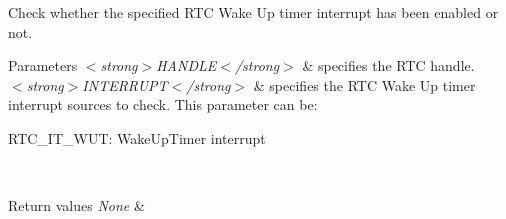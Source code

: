 Check whether the specified R\+TC Wake Up timer interrupt has been enabled or not. 


\begin{DoxyParams}{Parameters}
{\em $<$strong$>$\+H\+A\+N\+D\+L\+E$<$/strong$>$} & specifies the R\+TC handle. \\
\hline
{\em $<$strong$>$\+I\+N\+T\+E\+R\+R\+U\+P\+T$<$/strong$>$} & specifies the R\+TC Wake Up timer interrupt sources to check. This parameter can be\+: \begin{DoxyItemize}
\item R\+T\+C\+\_\+\+I\+T\+\_\+\+W\+UT\+: Wake\+Up\+Timer interrupt \end{DoxyItemize}
\\
\hline
\end{DoxyParams}

\begin{DoxyRetVals}{Return values}
{\em None} & \\
\hline
\end{DoxyRetVals}
